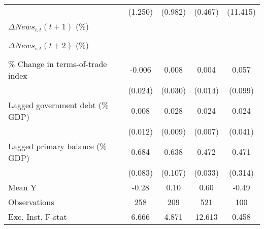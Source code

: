 {\begin{tabular}{l*{4}{c}}
                    &     (1.250)         &     (0.982)         &     (0.467)         &    (11.415)         \\
\addlinespace
$ \Delta News_{i,t}(t+1)$ (\%)&                     &                     &                     &                     \\
                    &                     &                     &                     &                     \\
\addlinespace
$ \Delta News_{i,t}(t+2)$ (\%)&                     &                     &                     &                     \\
                    &                     &                     &                     &                     \\
\addlinespace
\% Change in terms-of-trade index&      -0.006         &       0.008         &       0.004         &       0.057         \\
                    &     (0.024)         &     (0.030)         &     (0.014)         &     (0.099)         \\
\addlinespace
Lagged government debt (\% GDP)&       0.008         &       0.028\sym{***}&       0.024\sym{***}&       0.024         \\
                    &     (0.012)         &     (0.009)         &     (0.007)         &     (0.041)         \\
\addlinespace
Lagged primary balance (\% GDP)&       0.684\sym{***}&       0.638\sym{***}&       0.472\sym{***}&       0.471         \\
                    &     (0.083)         &     (0.107)         &     (0.033)         &     (0.314)         \\
\midrule
Mean Y              &       -0.28         &        0.10         &        0.60         &       -0.49         \\
Observations        &         258         &         209         &         521         &         100         \\
Exc. Inst. F-stat   &       6.666         &       4.871         &      12.613         &       0.458         \\
\bottomrule
\end{tabular}
}
